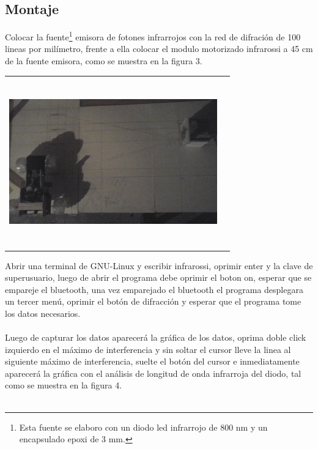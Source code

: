 \documentclass[12]{article}
\newenvironment{Figure}
{\par\medskip\noindent\minipage{\linewidth}}
{\endminipage\par\medskip}
\begin{document}
\begin{multicols}{2}
\subsection{Montaje}
Colocar la fuente\footnote{Esta fuente se elaboro con un diodo led infrarrojo de 800 nm y un encapsulado epoxi de 3 mm.} emisora de fotones infrarrojos con la red de difración de 100 lineas por milímetro, frente a ella colocar el modulo motorizado infrarossi a 45 cm de la fuente emisora, como se muestra en la figura 3. 
\begin{Figure}	
\center
\begin{tabular}{|l|r|}
\hline
\\
\includegraphics[width=9cm, height=7cm]{img/mon_difraccion.png} \\\\ \hline
\end{tabular}
\label{fig:g3}
\end{Figure}
\vspace{1cm}
Abrir una terminal de GNU-Linux y escribir infrarossi, oprimir enter y la clave de superusuario, luego de abrir el programa debe oprimir el boton on, esperar que se empareje el bluetooth, una vez emparejado el bluetooth el programa desplegara un tercer menú, oprimir el botón de difracción y esperar que el programa tome los datos necesarios.\\ \\
Luego de capturar los datos aparecerá la gráfica de los datos, oprima doble click izquierdo en el máximo de interferencia y sin soltar el cursor lleve la linea al siguiente máximo de interferencia,  suelte el botón del cursor e inmediatamente  aparecerá la gráfica con el análisis de longitud de onda infrarroja del diodo, tal como se muestra en la figura 4. \\\\

\end{multicols}
\end{document}
